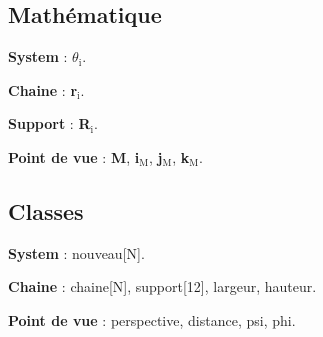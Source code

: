 \subsection{Mathématique}
\begin{description}[leftmargin=0.1cm, itemsep=5pt]
\item{\bf System} : $\theta _\text{i}$.
\item{\bf Chaine} : {\bf r}$_\text{i}$.
\item{\bf Support} : {\bf R}$_\text{i}$.
\item{\bf Point de vue} : {\bf M}, {\bf i}$_\text{M}$,
                                   {\bf j}$_\text{M}$,
                                   {\bf k}$_\text{M}$.
\end{description}
\subsection{Classes}
\begin{description}[leftmargin=0.1cm, itemsep=5pt]
\item{\bf System} : nouveau[N].
\item{\bf Chaine} : chaine[N], support[12], largeur, hauteur.
\item{\bf Point de vue} : perspective, distance, psi, phi.
\end{description}

